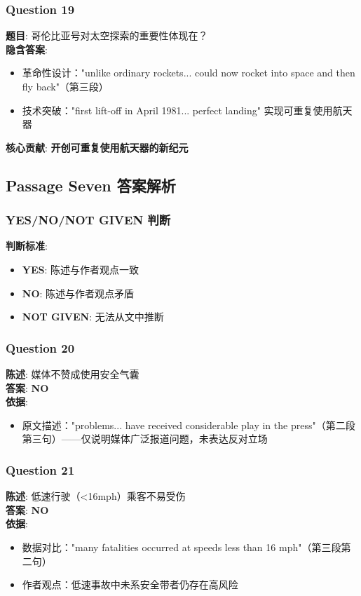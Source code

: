 \documentclass{article}
\begin{document}
\subsubsection*{Question 19}
\textbf{题目}: 哥伦比亚号对太空探索的重要性体现在？ \\
\textbf{隐含答案}:
\begin{itemize}
    \item 革命性设计："unlike ordinary rockets... could now rocket into space and then fly back"（第三段）
    \item 技术突破："first lift-off in April 1981... perfect landing" 实现可重复使用航天器
\end{itemize}
\textbf{核心贡献}: \textbf{开创可重复使用航天器的新纪元}



\subsection*{Passage Seven 答案解析}

\subsubsection*{YES/NO/NOT GIVEN 判断}
\textbf{判断标准}:
\begin{itemize}
    \item \textbf{YES}: 陈述与作者观点一致
    \item \textbf{NO}: 陈述与作者观点矛盾
    \item \textbf{NOT GIVEN}: 无法从文中推断
\end{itemize}

\subsubsection*{Question 20}
\textbf{陈述}: 媒体不赞成使用安全气囊 \\
\textbf{答案}: \textbf{NO} \\
\textbf{依据}:
\begin{itemize}
    \item 原文描述："problems... have received considerable play in the press"（第二段第三句）——仅说明媒体广泛报道问题，未表达反对立场
\end{itemize}

\subsubsection*{Question 21}
\textbf{陈述}: 低速行驶（<16mph）乘客不易受伤 \\
\textbf{答案}: \textbf{NO} \\
\textbf{依据}:
\begin{itemize}
    \item 数据对比："many fatalities occurred at speeds less than 16 mph"（第三段第二句）
    \item 作者观点：低速事故中未系安全带者仍存在高风险
\end{itemize}
\end{document}
